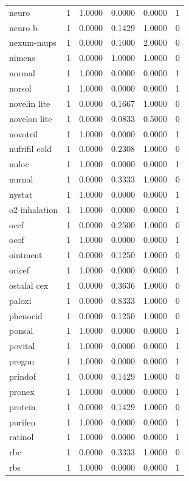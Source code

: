 \begin{longtable}{p{3.0cm}rrrrr}
neuro & 1 & 1.0000 & 0.0000 & 0.0000 & 1 \\
neuro b & 1 & 0.0000 & 0.1429 & 1.0000 & 0 \\
nexum-mups & 1 & 0.0000 & 0.1000 & 2.0000 & 0 \\
nimens & 1 & 0.0000 & 1.0000 & 1.0000 & 0 \\
normal & 1 & 1.0000 & 0.0000 & 0.0000 & 1 \\
norsol & 1 & 1.0000 & 0.0000 & 0.0000 & 1 \\
novelin lite & 1 & 0.0000 & 0.1667 & 1.0000 & 0 \\
novelon lite & 1 & 0.0000 & 0.0833 & 0.5000 & 0 \\
novotril & 1 & 1.0000 & 0.0000 & 0.0000 & 1 \\
nufrifil cold & 1 & 0.0000 & 0.2308 & 1.0000 & 0 \\
nuloc & 1 & 1.0000 & 0.0000 & 0.0000 & 1 \\
nurnal & 1 & 0.0000 & 0.3333 & 1.0000 & 0 \\
nystat & 1 & 1.0000 & 0.0000 & 0.0000 & 1 \\
o2 inhalation & 1 & 1.0000 & 0.0000 & 0.0000 & 1 \\
ocef & 1 & 0.0000 & 0.2500 & 1.0000 & 0 \\
ocof & 1 & 1.0000 & 0.0000 & 0.0000 & 1 \\
ointment & 1 & 0.0000 & 0.1250 & 1.0000 & 0 \\
oricef & 1 & 1.0000 & 0.0000 & 0.0000 & 1 \\
ostalal cex & 1 & 0.0000 & 0.3636 & 1.0000 & 0 \\
paloxi & 1 & 0.0000 & 0.8333 & 1.0000 & 0 \\
phenocid & 1 & 0.0000 & 0.1250 & 1.0000 & 0 \\
ponsal & 1 & 1.0000 & 0.0000 & 0.0000 & 1 \\
povital & 1 & 1.0000 & 0.0000 & 0.0000 & 1 \\
pregan & 1 & 1.0000 & 0.0000 & 0.0000 & 1 \\
prindof & 1 & 0.0000 & 0.1429 & 1.0000 & 0 \\
pronex & 1 & 1.0000 & 0.0000 & 0.0000 & 1 \\
protein & 1 & 0.0000 & 0.1429 & 1.0000 & 0 \\
purifen & 1 & 1.0000 & 0.0000 & 0.0000 & 1 \\
ratinol & 1 & 1.0000 & 0.0000 & 0.0000 & 1 \\
rbc & 1 & 0.0000 & 0.3333 & 1.0000 & 0 \\
rbs & 1 & 1.0000 & 0.0000 & 0.0000 & 1 \\

\end{longtable}
